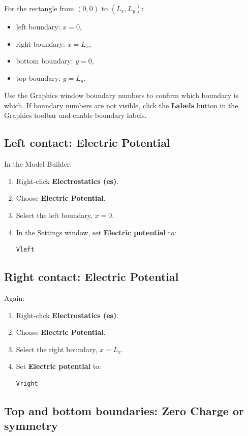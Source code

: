 \documentclass[11pt]{article}
\begin{document}
For the rectangle from $(0,0)$ to $(L_x,L_y)$:
\begin{itemize}[leftmargin=2em]
\item left boundary: $x=0$,
\item right boundary: $x=L_x$,
\item bottom boundary: $y=0$,
\item top boundary: $y=L_y$.
\end{itemize}
Use the Graphics window boundary numbers to confirm which boundary is which. If boundary numbers are not visible, click the \textbf{Labels} button in the Graphics toolbar and enable boundary labels.

\subsection{Left contact: Electric Potential}

In the Model Builder:
\begin{enumerate}[leftmargin=2em]
\item Right-click \textbf{Electrostatics (es)}.
\item Choose \textbf{Electric Potential}.
\item Select the left boundary, $x=0$.
\item In the Settings window, set \textbf{Electric potential} to:
\begin{verbatim}
Vleft
\end{verbatim}
\end{enumerate}

\subsection{Right contact: Electric Potential}

Again:
\begin{enumerate}[leftmargin=2em]
\item Right-click \textbf{Electrostatics (es)}.
\item Choose \textbf{Electric Potential}.
\item Select the right boundary, $x=L_x$.
\item Set \textbf{Electric potential} to:
\begin{verbatim}
Vright
\end{verbatim}
\end{enumerate}

\subsection{Top and bottom boundaries: Zero Charge or symmetry}
\end{document}
